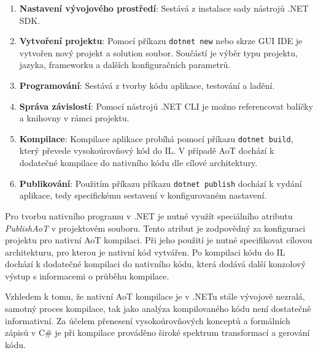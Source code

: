 \begin{enumerate}
    \item \textbf{Nastavení vývojového prostředí}: Sestává z instalace sady nástrojů .NET SDK.
    
    \item \textbf{Vytvoření projektu}: Pomocí příkazu \texttt{dotnet new} nebo skrze GUI IDE je vytvořen nový projekt a solution soubor. Součástí je výběr typu projektu, jazyka, frameworku a dalších konfiguračních parametrů.
    
    \item \textbf{Programování}: Sestává z tvorby kódu aplikace, testování a ladění.

    \item \textbf{Správa závislostí}: Pomocí nástrojů .NET CLI je možno referencovat balíčky a knihovny v rámci projektu.
    
    \item \textbf{Kompilace}: Kompilace aplikace probíhá pomocí příkazu \texttt{dotnet build}, který převede vysokoúrovňový kód do IL. V případě AoT dochází k dodatečné kompilace do nativního kódu dle cílové architektury.
    
    \item \textbf{Publikování}: Použitím příkazu příkazu \texttt{dotnet publish} dochází k vydání aplikace, tedy specifickému sestavení v konfigurovaném nastavení.
\end{enumerate}


Pro tvorbu nativního programu v .NET je nutné využít speciálního atributu \emph{PublishAoT} v projektovém souboru. Tento atribut je zodpovědný za konfiguraci projektu pro nativní AoT kompilaci. Při jeho použití je nutné specifikovat cílovou architekturu, pro kterou je nativní kód vytvářen. Po kompilaci kódu do IL dochází k dodatečné kompilaci do nativního kódu, která dodává další konzolový výstup s informacemi o průběhu kompilace.

Vzhledem k tomu, že nativní AoT kompilace je v .NETu stále vývojově nezralá, samotný proces kompilace, tak jako analýza kompilovaného kódu není dostatečně informativní. Za účelem přenesení vysokoúrovňových konceptů a formálních zápisů v C\# je při kompilace prováděno široké spektrum transformací a gerování kódu.

